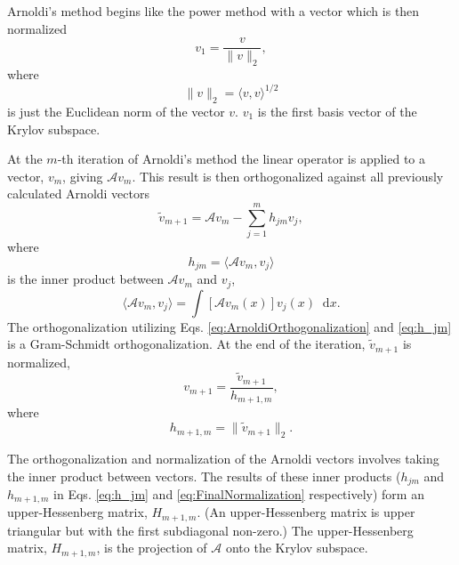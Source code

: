 \documentclass[12]{ansnse}
\newcommand{\A}{\ensuremath{\mathcal{A}}}
\newcommand{\dd}{\ensuremath{\mathop{}\!\mathrm{d}}}
\begin{document}
\begin{doublespace}
Arnoldi's method begins like the power method with a vector which is then normalized
\begin{equation}
    v_1 = \frac{v}{\|v\|_2},
\end{equation}
where
\begin{equation}
    \|v\|_2 = \langle v, v\rangle^{1/2}
\end{equation}
is just the Euclidean norm of the vector $v$.  $v_1$ is the first basis vector of the Krylov subspace.

At the $m$-th iteration of Arnoldi's method the linear operator is applied to a vector, $v_m$, giving $\A v_m$.  This result is then orthogonalized against all previously calculated Arnoldi vectors
\begin{equation}
    \tilde{v}_{m+1} = \A v_m - \sum_{j=1}^m h_{jm}v_j,
    \label{eq:ArnoldiOrthogonalization}
\end{equation}
where
\begin{equation}
    h_{jm} = \langle \A v_m, v_j\rangle
    \label{eq:h_jm}
\end{equation}
is the inner product between $\A v_m$ and $v_j$,
\begin{equation}
    \langle \A v_m, v_j\rangle = \int \left[\A v_m(x)\right]v_j(x) \dd x.
    \label{eq:hInnerProduct}
\end{equation}
The orthogonalization utilizing Eqs. \eqref{eq:ArnoldiOrthogonalization} and \eqref{eq:h_jm} is a Gram-Schmidt orthogonalization.  At the end of the iteration, $\tilde{v}_{m+1}$ is normalized,
\begin{equation}
    v_{m+1} = \frac{\tilde{v}_{m+1}}{h_{m+1, m}},
    \label{eq:ArnoldiNormalization}
\end{equation}
where
\begin{equation}
    h_{m+1,m} = \|\tilde{v}_{m+1}\|_{2}.
    \label{eq:FinalNormalization}
\end{equation}

The orthogonalization and normalization of the Arnoldi vectors involves taking the inner product between vectors.  The results of these inner products ($h_{jm}$ and $h_{m+1,m}$ in Eqs. \eqref{eq:h_jm} and \eqref{eq:FinalNormalization} respectively) form an upper-Hessenberg matrix, $H_{m+1,m}$.  (An upper-Hessenberg matrix is upper triangular but with the first subdiagonal non-zero.)  The upper-Hessenberg matrix, $H_{m+1, m}$, is the projection of \A{} onto the Krylov subspace.


\end{doublespace}
\end{document}
